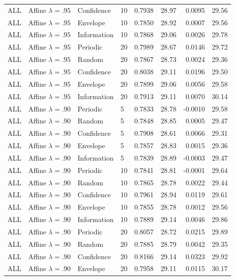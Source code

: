 \begin{longtable}{llllrrrr}
ALL & Affine $\lambda=.95$ & Confidence & 10 & 0.7938 & 28.97 & 0.0095 & 29.56 \\
ALL & Affine $\lambda=.95$ & Envelope & 10 & 0.7850 & 28.92 & 0.0007 & 29.56 \\
ALL & Affine $\lambda=.95$ & Information & 10 & 0.7868 & 29.06 & 0.0026 & 29.78 \\
ALL & Affine $\lambda=.95$ & Periodic & 20 & 0.7989 & 28.67 & 0.0146 & 29.72 \\
ALL & Affine $\lambda=.95$ & Random & 20 & 0.7867 & 28.73 & 0.0024 & 29.36 \\
ALL & Affine $\lambda=.95$ & Confidence & 20 & 0.8038 & 29.11 & 0.0196 & 29.50 \\
ALL & Affine $\lambda=.95$ & Envelope & 20 & 0.7899 & 29.06 & 0.0056 & 29.58 \\
ALL & Affine $\lambda=.95$ & Information & 20 & 0.7913 & 29.11 & 0.0070 & 30.14 \\
ALL & Affine $\lambda=.90$ & Periodic & 5 & 0.7833 & 28.78 & -0.0010 & 29.58 \\
ALL & Affine $\lambda=.90$ & Random & 5 & 0.7848 & 28.85 & 0.0005 & 29.47 \\
ALL & Affine $\lambda=.90$ & Confidence & 5 & 0.7908 & 28.61 & 0.0066 & 29.31 \\
ALL & Affine $\lambda=.90$ & Envelope & 5 & 0.7857 & 28.83 & 0.0015 & 29.36 \\
ALL & Affine $\lambda=.90$ & Information & 5 & 0.7839 & 28.89 & -0.0003 & 29.47 \\
ALL & Affine $\lambda=.90$ & Periodic & 10 & 0.7841 & 28.81 & -0.0001 & 29.64 \\
ALL & Affine $\lambda=.90$ & Random & 10 & 0.7865 & 28.78 & 0.0022 & 29.44 \\
ALL & Affine $\lambda=.90$ & Confidence & 10 & 0.7961 & 28.94 & 0.0119 & 29.61 \\
ALL & Affine $\lambda=.90$ & Envelope & 10 & 0.7855 & 28.78 & 0.0012 & 29.56 \\
ALL & Affine $\lambda=.90$ & Information & 10 & 0.7889 & 29.14 & 0.0046 & 29.86 \\
ALL & Affine $\lambda=.90$ & Periodic & 20 & 0.8057 & 28.72 & 0.0215 & 29.89 \\
ALL & Affine $\lambda=.90$ & Random & 20 & 0.7885 & 28.79 & 0.0042 & 29.35 \\
ALL & Affine $\lambda=.90$ & Confidence & 20 & 0.8166 & 29.14 & 0.0323 & 29.92 \\
ALL & Affine $\lambda=.90$ & Envelope & 20 & 0.7958 & 29.11 & 0.0115 & 30.17 \\

\end{longtable}

